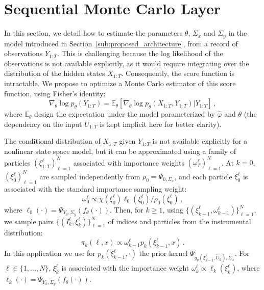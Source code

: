 \documentclass[journal]{IEEEtran}
\begin{document}
\section{Sequential Monte Carlo Layer}%
\label{sub:uncertainty_estimation}
In this section, we detail how to estimate the parameters $\theta$, $\Sigma_x$ and $\Sigma_y$ in the model introduced in Section~\ref{sub:proposed_architecture}, from a record of observations $Y_{1:T}$.
This is challenging because the log likelihood of the observations is not available explicitly, as it would require integrating over the distribution of the hidden states $X_{1:T}$.
Consequently, the score function is intractable.
We propose to optimize a Monte Carlo estimator of this score function, using Fisher's identity:
\begin{equation}
	\nabla_\theta \log p_\theta(Y_{1:T}) = \mathbb{E}_\theta \left[ \nabla_\theta\log p_\theta(X_{1:T}, Y_{1:T}) | Y_{1:T} \right]\,,
	\label{eq:grad_ll}
\end{equation}
where $\mathbb{E}_\theta$ design the expectation under the model parameterized by $\widehat \varphi$ and $\theta$ (the dependency on the input $U_{1:T}$ is kept implicit here for better clarity).

The conditional distribution of $X_{1:T}$ given $Y_{1:T}$ is not available explicitly for a nonlinear state space model, but it can be approximated using a family of particles $(\xi^{\ell}_{1:T})_{\ell=1}^N$ associated with importance weights $(\omega^{\ell}_T)_{\ell=1}^N$.
At $k = 0$, $(\xi^{\ell}_0)_{\ell=1}^N$ are sampled independently from $\rho_0 = \Psi_{0, \Sigma_x}$, and each particle $\xi^{\ell}_0$ is associated with the standard importance sampling weight:
\[
	\omega_0^{\ell} \propto \chi\left(\xi^{\ell}_0\right)\ell_0 \left(\xi^{\ell}_0\right)/ \rho_0 \left(\xi^{\ell}_0\right)\,,
\]
where $\ell_0(\cdot) = \Psi_{Y_0, \Sigma_y}(f_\theta(\cdot))$.
Then, for $k\geq 1$, using $\{(\xi^{\ell}_{k-1},\omega^{\ell}_{k-1})\}_{\ell=1}^N$, we sample pairs $\{(I^{\ell}_k,\xi^{\ell}_{k})\}_{\ell=1}^N$ of indices and particles from the instrumental distribution:
\[
	\pi_{k}(\ell,x) \propto \omega_{k-1}^{\ell} p_k(\xi^{\ell}_{k-1},x)\,.
\]
In this application we use for $p_k(\xi^{\ell}_{k-1},\cdot)$ the prior kernel $\Psi_{g_\theta(\xi^\ell_{k-1}, \tilde U_k), \Sigma_x}$.
For $\ell \in \{1,\ldots,N\}$, $\xi^{\ell}_k$ is associated with the importance weight $\omega^{\ell}_k \propto \ell_k(\xi^{\ell}_k)$, where $\ell_k(\cdot) = \Psi_{Y_k, \Sigma_y}(f_\theta(\cdot))$.
\end{document}
